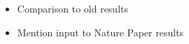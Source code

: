 
\begin{itemize}
    \item Comparison to old results
    \item Mention input to Nature Paper results
\end{itemize}

